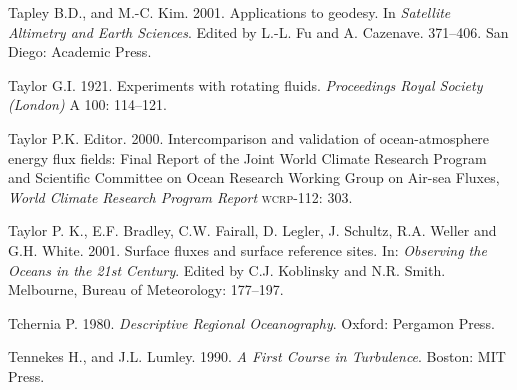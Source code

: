 \begin{thebibliography}{999}
Tapley B.D., and M.-C. Kim.  2001. Applications to geodesy. In
\textit{Satellite Altimetry and Earth Sciences}. Edited by L.-L. Fu
and A.  Cazenave. 371--406. San Diego: Academic Press.
%

Taylor G.I.  1921. Experiments with rotating
fluids. \textit{Proceedings Royal Society (London)} A 100: 114--121.
%

Taylor P.K. Editor.  2000. Intercomparison and validation of
ocean-atmosphere energy flux fields: Final Report of the Joint World
Climate Research Program and Scientific Committee on Ocean Research
Working Group on Air-sea Fluxes, \textit{World Climate Research
  Program Report} \textsc{wcrp}-112: 303.
%

Taylor P. K., E.F. Bradley, C.W. Fairall, D. Legler, J. Schultz,
R.A. Weller and G.H. White. 2001. Surface fluxes and surface reference
sites. In: \textit{Observing the Oceans in the 21st Century}. Edited
by C.J. Koblinsky and N.R. Smith. Melbourne, Bureau of Meteorology:
177--197.
%

Tchernia P.  1980. \textit{Descriptive Regional Oceanography}. Oxford:
Pergamon Press.
%

Tennekes H., and J.L. Lumley.  1990. \textit{A First Course in
  Turbulence}.  Boston: MIT Press.
%


\end{thebibliography}
